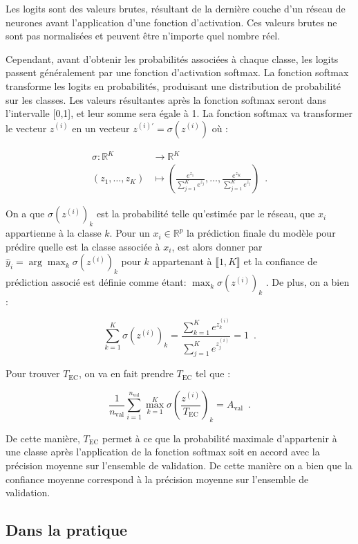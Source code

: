 \documentclass[
  letterpaper,
  DIV=11,
  numbers=noendperiod]{scrartcl}
\begin{document}
Les logits sont des valeurs brutes, résultant de la dernière couche d'un
réseau de neurones avant l'application d'une fonction d'activation. Ces
valeurs brutes ne sont pas normalisées et peuvent être n'importe quel
nombre réel.

Cependant, avant d'obtenir les probabilités associées à chaque classe,
les logits passent généralement par une fonction d'activation softmax.
La fonction softmax transforme les logits en probabilités, produisant
une distribution de probabilité sur les classes. Les valeurs résultantes
après la fonction softmax seront dans l'intervalle {[}0,1{]}, et leur
somme sera égale à 1. La fonction softmax va transformer le vecteur
\(z^{(i)}\) en un vecteur \(z^{(i)'}=\sigma(z^{(i)})\) où :

\begin{align*}
\sigma : \mathbb{R}^K & \to \mathbb{R}^K \\
(z_1, \dots, z_K) & \mapsto \left(\frac{e^{z_{1}}}{\sum_{j=1}^{K} e^{z_{j}}},\dots, \frac{e^{z_{K}}}{\sum_{j=1}^{K} e^{z_{j}}} \right)\enspace .
\end{align*}

On a que \(\sigma(z^{(i)})_k\) est la probabilité telle qu'estimée par
le réseau, que \(x_i\) appartienne à la classe \(k\). Pour un
\(x_i \in \mathbb{R}^p\) la prédiction finale du modèle pour prédire
quelle est la classe associée à \(x_i\), est alors donner par
\(\hat{y}_i=\arg\max_{k}\sigma(z^{(i)})_k\) pour \(k\) appartenant à
\(\llbracket 1, K \rrbracket\) et la confiance de prédiction associé est
définie comme étant: \(\max_{k}\sigma(z^{(i)})_k\) . De plus, on a bien
:

\[
\sum_{k=1}^{K} \sigma(z^{(i)})_k = \frac{\sum_{k=1}^{K} e^{z_{k}^{(i)}}}{\sum_{j=1}^{K} e^{z_{j}^{(i)}}} = 1 \enspace .
\]

Pour trouver \(T_{\text{EC}}\), on va en fait prendre \(T_{\text{EC}}\)
tel que :

\[
\frac{1}{n_{\text{val}}} \sum_{i =1}^{n_{\text{val}}} \max_{k=1}^{K} \sigma \left(\frac{z^{(i)}}{T_{\text{EC}}}\right)_k = A_{\text{val}} \enspace .
\]

De cette manière, \(T_{\text{EC}}\) permet à ce que la probabilité
maximale d'appartenir à une classe après l'application de la fonction
softmax soit en accord avec la précision moyenne sur l'ensemble de
validation. De cette manière on a bien que la confiance moyenne
correspond à la précision moyenne sur l'ensemble de validation.

\hypertarget{dans-la-pratique}{%
\subsection{Dans la pratique}\label{dans-la-pratique}}
\end{document}
